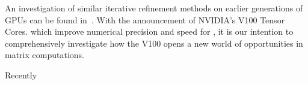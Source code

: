 An investigation of similar iterative refinement methods
on earlier generations of GPUs can be found in~\cite{Haidar2017}.
With the
announcement of NVIDIA's V100 Tensor Cores. which improve
numerical precision and speed for \fhp, it is our
intention to comprehensively investigate how the V100 opens a
new world of opportunities in matrix computations.

Recently~\cite{Haidar2018}